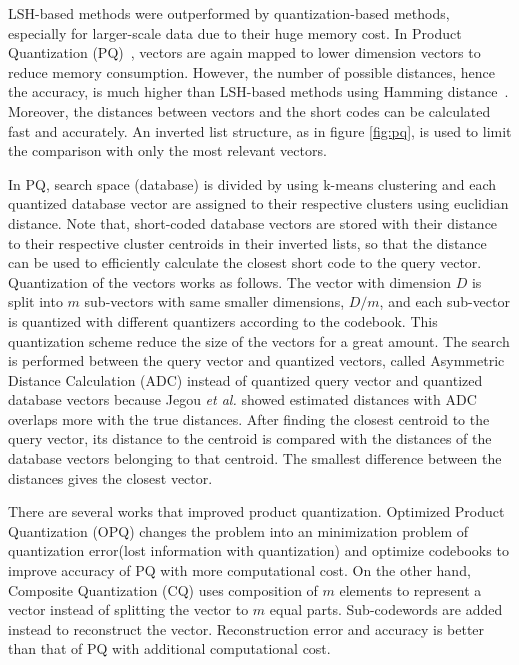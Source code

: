 LSH-based methods were outperformed by quantization-based methods, especially for larger-scale data due to their huge memory cost.
In Product Quantization (PQ)~\cite{jegou2010product}, vectors are again mapped to lower dimension vectors to reduce memory consumption. 
However, the number of possible distances, hence the accuracy, is much higher than LSH-based methods using Hamming distance~\cite{weiss2009spectral}.
Moreover, the distances between vectors and the short codes can be calculated fast and accurately.
An inverted list structure, as in figure \ref{fig:pq}, is used to limit the comparison with only the most relevant vectors.

In PQ, search space (database) is divided by using k-means clustering and each quantized database vector are assigned to their respective clusters using euclidian distance. 
Note that, short-coded database vectors are stored with their distance to their respective cluster centroids in their inverted lists, so that the distance can be used to efficiently calculate the closest short code to the query vector.
Quantization of the vectors works as follows.
The vector with dimension $D$ is split into $m$ sub-vectors with same smaller dimensions, $D/m$, and each sub-vector is quantized with different quantizers according to the codebook. 
This quantization scheme reduce the size of the vectors for a great amount.
The search is performed between the query vector and quantized vectors, called Asymmetric Distance Calculation (ADC) instead of quantized query vector and quantized database vectors because Jegou \emph{et al.} showed estimated distances with ADC overlaps more with the true distances.
After finding the closest centroid to the query vector, its distance to the centroid is compared with the distances of the database vectors belonging to that centroid. 
The smallest difference between the distances gives the closest vector.

There are several works that improved product quantization. Optimized Product Quantization (OPQ)\cite{ge2013optimized} changes the problem into an minimization problem of quantization error(lost information with quantization) and optimize codebooks to improve accuracy of PQ with more computational cost. 
On the other hand, Composite Quantization (CQ)\cite{wang2018composite} uses composition of $m$ elements to represent a vector instead of splitting the vector to $m$ equal parts. 
Sub-codewords are added instead to reconstruct the vector. 
Reconstruction error and accuracy is better than that of PQ with additional computational cost.

